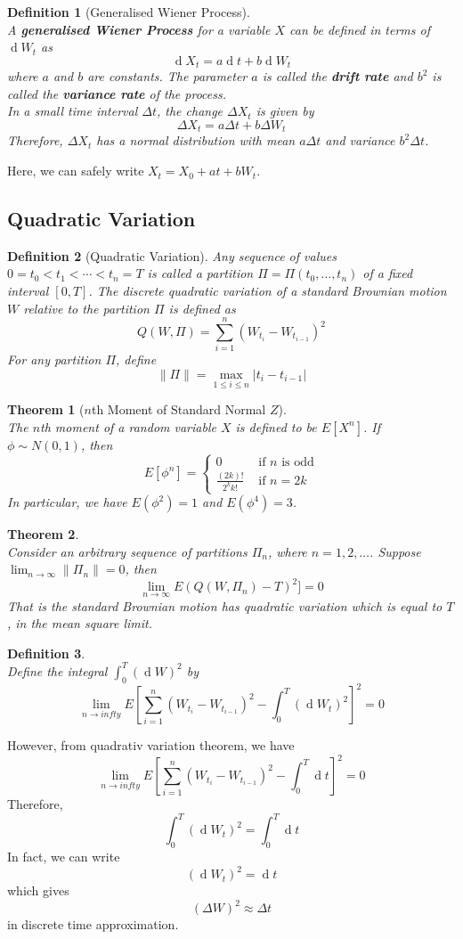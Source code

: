 \documentclass[12pt]{article}
\newtheorem{definition}{Definition}[section]
\newtheorem{theorem}{Theorem}[section]
\theoremstyle{definition}
\DeclareMathOperator{\diff}{d}
\begin{document}
\begin{definition}[Generalised Wiener Process]
\hfill\\\normalfont A \textbf{generalised Wiener Process} for a variable $X$ can be defined in terms of $\diff W_t$ as
\[
\diff X_t = a\diff t + b\diff W_t
\]
where $a$ and $b$ are constants. The parameter $a$ is called the \textbf{drift rate} and $b^2$ is called the \textbf{variance rate} of the process.\\
In a small time interval $\Delta t$, the change $\Delta X_t$ is given by
\[
\Delta X_t = a\Delta t + b\Delta W_t
\]
Therefore, $\Delta X_t$ has a normal distribution with mean $a\Delta t$ and variance $b^2\Delta t$.
\end{definition}
Here, we can safely write $X_t = X_0+at+bW_t$.
\subsection{Quadratic Variation}
\begin{definition}[Quadratic Variation]
Any sequence of values $0=t_0<t_1<\cdots<t_n=T$ is called a partition $\Pi=\Pi(t_0,\ldots, t_n)$ of a fixed interval $[0,T]$. The discrete quadratic variation of a standard Brownian motion $W$ relative to the partition $\Pi$ is defined as
\[
Q(W,\Pi) = \sum_{i=1}^n (W_{t_i}-W_{t_{i-1}})^2
\]
For any partition $\Pi$, define
\[
\|\Pi\| = \max_{1\leq i\leq n}|t_i-t_{i-1}|
\]
\end{definition}
\begin{theorem}[{$n$}th Moment of Standard Normal {$Z$}]
\hfill\\\normalfont The $n$th moment of a random variable $X$ is defined to be $E[X^n]$. If $\phi\sim N(0,1)$, then
\[
E[\phi^n] = \begin{cases}
0&\text{ if }n\text{ is odd}\\
\frac{(2k)!}{2^kk!}&\text{ if }n=2k
\end{cases}
\]
In particular, we have $E(\phi^2) = 1$ and $E(\phi^4) = 3$.
\end{theorem}
\begin{theorem}
\hfill\\\normalfont Consider an arbitrary sequence of partitions $\Pi_n$, where $n = 1,2,\ldots$. Suppose $\lim_{n\to \infty} \|\Pi_n\|=0$, then
\[
\lim_{n\to \infty} E(Q(W,\Pi_n)-T)^2] = 0
\]
That is the standard Brownian motion has quadratic variation which is equal to $T$, in the mean square limit.
\end{theorem}
\begin{definition}
\hfill\\\normalfont Define the integral $\int_0^T (\diff W)^2$ by
\[
\lim_{n\to infty} E[\sum_{i=1}^n (W_{t_i}-W_{t_{i-1}})^2 - \int_0^T(\diff W_t)^2]^2 = 0
\]
\end{definition}
However, from quadrativ variation theorem, we have
\[
\lim_{n\to infty} E[\sum_{i=1}^n (W_{t_i}-W_{t_{i-1}})^2 - \int_0^T\diff t]^2 = 0
\]
Therefore,
\[
\int_0^T(\diff W_t)^2=\int_0^T\diff t
\]
In fact, we can write
\[
(\diff W_t)^2 = \diff t
\]
which gives
\[
(\Delta W)^2 \approx \Delta t
\]
in discrete time approximation.
\end{document}
